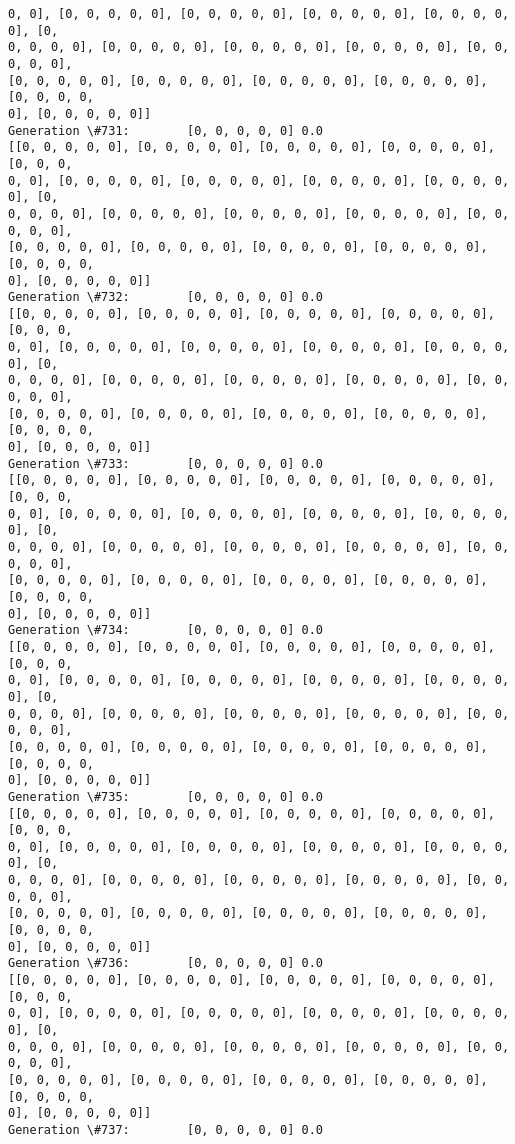 \documentclass[11pt]{article}
\begin{document}
\begin{Verbatim}[commandchars=\\\{\}]
0, 0], [0, 0, 0, 0, 0], [0, 0, 0, 0, 0], [0, 0, 0, 0, 0], [0, 0, 0, 0, 0], [0,
0, 0, 0, 0], [0, 0, 0, 0, 0], [0, 0, 0, 0, 0], [0, 0, 0, 0, 0], [0, 0, 0, 0, 0],
[0, 0, 0, 0, 0], [0, 0, 0, 0, 0], [0, 0, 0, 0, 0], [0, 0, 0, 0, 0], [0, 0, 0, 0,
0], [0, 0, 0, 0, 0]]
Generation \#731:        [0, 0, 0, 0, 0] 0.0
[[0, 0, 0, 0, 0], [0, 0, 0, 0, 0], [0, 0, 0, 0, 0], [0, 0, 0, 0, 0], [0, 0, 0,
0, 0], [0, 0, 0, 0, 0], [0, 0, 0, 0, 0], [0, 0, 0, 0, 0], [0, 0, 0, 0, 0], [0,
0, 0, 0, 0], [0, 0, 0, 0, 0], [0, 0, 0, 0, 0], [0, 0, 0, 0, 0], [0, 0, 0, 0, 0],
[0, 0, 0, 0, 0], [0, 0, 0, 0, 0], [0, 0, 0, 0, 0], [0, 0, 0, 0, 0], [0, 0, 0, 0,
0], [0, 0, 0, 0, 0]]
Generation \#732:        [0, 0, 0, 0, 0] 0.0
[[0, 0, 0, 0, 0], [0, 0, 0, 0, 0], [0, 0, 0, 0, 0], [0, 0, 0, 0, 0], [0, 0, 0,
0, 0], [0, 0, 0, 0, 0], [0, 0, 0, 0, 0], [0, 0, 0, 0, 0], [0, 0, 0, 0, 0], [0,
0, 0, 0, 0], [0, 0, 0, 0, 0], [0, 0, 0, 0, 0], [0, 0, 0, 0, 0], [0, 0, 0, 0, 0],
[0, 0, 0, 0, 0], [0, 0, 0, 0, 0], [0, 0, 0, 0, 0], [0, 0, 0, 0, 0], [0, 0, 0, 0,
0], [0, 0, 0, 0, 0]]
Generation \#733:        [0, 0, 0, 0, 0] 0.0
[[0, 0, 0, 0, 0], [0, 0, 0, 0, 0], [0, 0, 0, 0, 0], [0, 0, 0, 0, 0], [0, 0, 0,
0, 0], [0, 0, 0, 0, 0], [0, 0, 0, 0, 0], [0, 0, 0, 0, 0], [0, 0, 0, 0, 0], [0,
0, 0, 0, 0], [0, 0, 0, 0, 0], [0, 0, 0, 0, 0], [0, 0, 0, 0, 0], [0, 0, 0, 0, 0],
[0, 0, 0, 0, 0], [0, 0, 0, 0, 0], [0, 0, 0, 0, 0], [0, 0, 0, 0, 0], [0, 0, 0, 0,
0], [0, 0, 0, 0, 0]]
Generation \#734:        [0, 0, 0, 0, 0] 0.0
[[0, 0, 0, 0, 0], [0, 0, 0, 0, 0], [0, 0, 0, 0, 0], [0, 0, 0, 0, 0], [0, 0, 0,
0, 0], [0, 0, 0, 0, 0], [0, 0, 0, 0, 0], [0, 0, 0, 0, 0], [0, 0, 0, 0, 0], [0,
0, 0, 0, 0], [0, 0, 0, 0, 0], [0, 0, 0, 0, 0], [0, 0, 0, 0, 0], [0, 0, 0, 0, 0],
[0, 0, 0, 0, 0], [0, 0, 0, 0, 0], [0, 0, 0, 0, 0], [0, 0, 0, 0, 0], [0, 0, 0, 0,
0], [0, 0, 0, 0, 0]]
Generation \#735:        [0, 0, 0, 0, 0] 0.0
[[0, 0, 0, 0, 0], [0, 0, 0, 0, 0], [0, 0, 0, 0, 0], [0, 0, 0, 0, 0], [0, 0, 0,
0, 0], [0, 0, 0, 0, 0], [0, 0, 0, 0, 0], [0, 0, 0, 0, 0], [0, 0, 0, 0, 0], [0,
0, 0, 0, 0], [0, 0, 0, 0, 0], [0, 0, 0, 0, 0], [0, 0, 0, 0, 0], [0, 0, 0, 0, 0],
[0, 0, 0, 0, 0], [0, 0, 0, 0, 0], [0, 0, 0, 0, 0], [0, 0, 0, 0, 0], [0, 0, 0, 0,
0], [0, 0, 0, 0, 0]]
Generation \#736:        [0, 0, 0, 0, 0] 0.0
[[0, 0, 0, 0, 0], [0, 0, 0, 0, 0], [0, 0, 0, 0, 0], [0, 0, 0, 0, 0], [0, 0, 0,
0, 0], [0, 0, 0, 0, 0], [0, 0, 0, 0, 0], [0, 0, 0, 0, 0], [0, 0, 0, 0, 0], [0,
0, 0, 0, 0], [0, 0, 0, 0, 0], [0, 0, 0, 0, 0], [0, 0, 0, 0, 0], [0, 0, 0, 0, 0],
[0, 0, 0, 0, 0], [0, 0, 0, 0, 0], [0, 0, 0, 0, 0], [0, 0, 0, 0, 0], [0, 0, 0, 0,
0], [0, 0, 0, 0, 0]]
Generation \#737:        [0, 0, 0, 0, 0] 0.0

\end{Verbatim}
\end{document}
